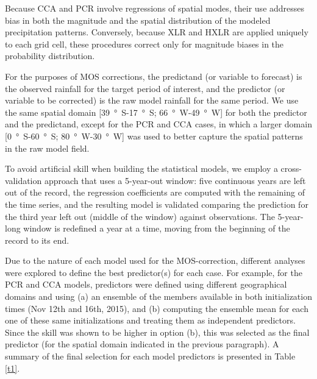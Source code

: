 \documentclass{ametsoc}
\begin{document}
Because CCA and PCR involve regressions of spatial modes, their use addresses bias in both the magnitude and the spatial distribution of the modeled precipitation patterns. Conversely, because XLR and HXLR are applied uniquely to each grid cell, these procedures correct only for magnitude biases in the probability distribution.

For the purposes of MOS corrections, the predictand (or variable to forecast) is the observed rainfall for the target period of interest, and the predictor (or variable to be corrected) is the raw model rainfall for the same period.
We use the same spatial domain [\SI{39}{\degree S}-\SI{17}{\degree S}; \SI{66}{\degree W}-\SI{49}{\degree W}] for both the predictor and the predictand, except for the PCR and CCA cases, in which a larger domain [\SI{0}{\degree S}-\SI{60}{\degree S}; \SI{80}{\degree W}-\SI{30}{\degree W}] was used to better capture the spatial patterns in the raw model field.

To avoid artificial skill when building the statistical models, we employ a cross-validation approach that uses a 5-year-out window: five continuous years are left out of the record, the regression coefficients are computed with the remaining of the time series, and the resulting model is validated comparing the prediction for the third year left out (middle of the window) against observations.
The 5-year-long window is redefined a year at a time, moving from the beginning of the record to its end.

Due to the nature of each model used for the MOS-correction, different analyses were explored to define the best predictor(s) for each case.
For example, for the PCR and CCA models, predictors were defined using different geographical domains and using (a) an ensemble of the members available in both initialization times (Nov 12th and 16th, 2015), and (b) computing the ensemble mean for each one of these same initializations and treating them as independent predictors.
Since the skill was shown to be higher in option (b), this was selected as the final predictor (for the spatial domain indicated in the previous paragraph).
A summary of the final selection for each model predictors is presented in Table \ref{t1}.
\end{document}
